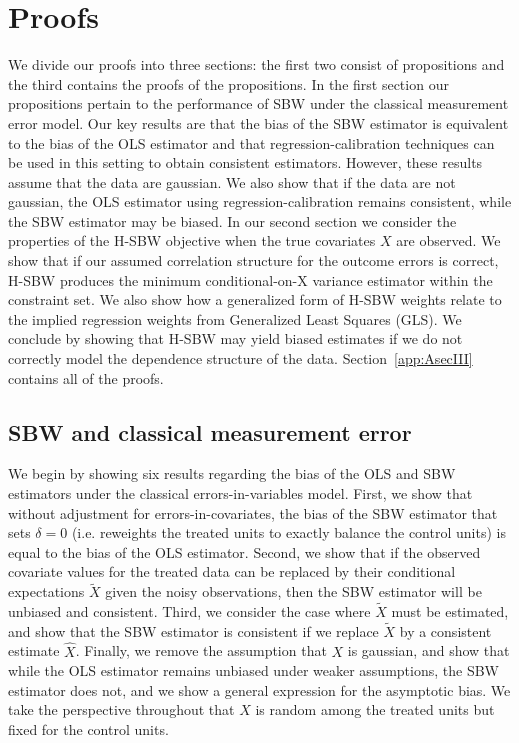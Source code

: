 \section{Proofs}\label{ssec:proof}

We divide our proofs into three sections: the first two consist of propositions and the third contains the proofs of the propositions. In the first section our propositions pertain to the performance of SBW under the classical measurement error model. Our key results are that the bias of the SBW estimator is equivalent to the bias of the OLS estimator and that regression-calibration techniques can be used in this setting to obtain consistent estimators. However, these results assume that the data are gaussian. We also show that if the data are not gaussian, the OLS estimator using regression-calibration remains consistent, while the SBW estimator may be biased. In our second section we consider the properties of the H-SBW objective when the true covariates $X$ are observed. We show that if our assumed correlation structure for the outcome errors is correct, H-SBW produces the minimum conditional-on-X variance estimator within the constraint set. We also show how a generalized form of H-SBW weights relate to the implied regression weights from Generalized Least Squares (GLS). We conclude by showing that H-SBW may yield biased estimates if we do not correctly model the dependence structure of the data. Section~\ref{app:AsecIII} contains all of the proofs.

\subsection{SBW and classical measurement error}\label{app:AsecI}

We begin by showing six results regarding the bias of the OLS and SBW estimators under the classical errors-in-variables model. First, we show that without adjustment for errors-in-covariates, the bias of the SBW estimator that sets $\delta = 0$ (i.e. reweights the treated units to exactly balance the control units) is equal to the bias of the OLS estimator. Second, we show that if the observed covariate values for the treated data can be replaced by their conditional expectations $\tilde{X}$ given the noisy observations, then the SBW estimator will be unbiased and consistent. Third, we consider the case where $\tilde{X}$ must be estimated, and show that the SBW estimator is consistent if we replace $\tilde{X}$ by a consistent estimate $\hat{X}$. Finally, we remove the assumption that $X$ is gaussian, and show that while the OLS estimator remains unbiased under weaker assumptions, the SBW estimator does not, and we show a general expression for the asymptotic bias. We take the perspective throughout that $X$ is random among the treated units but fixed for the control units.

